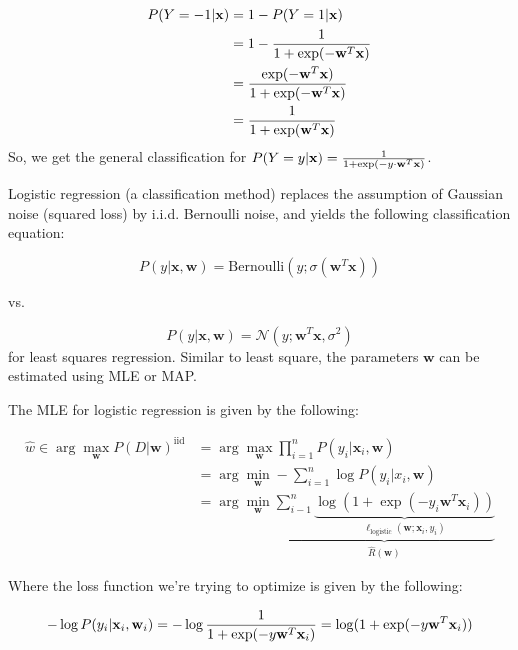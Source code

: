 \documentclass[a4paper,10pt,twoside]{article}
\begin{document}
\begin{align*}
  P(Y=-1|\mathbf{x}) &= 1 - P(Y=1|\mathbf{x})\\
                     &= 1 - {1\over 1+\exp(-\mathbf{w}^T\mathbf{x})}\\
                     &= {\exp(-\mathbf{w}^T\mathbf{x})\over 1+\exp(-\mathbf{w}^T\mathbf{x})}\\
                     &= {1\over 1+\exp(\mathbf{w}^T\mathbf{x})}
\end{align*}
So, we get the general classification for $P(Y=y|\mathbf{x}) = {1\over 1+\exp(-y\cdot\mathbf{w}^T\mathbf{x})}$.

Logistic regression (a classification method) replaces the assumption of Gaussian noise (squared loss) by i.i.d. Bernoulli noise, and yields the following classification equation:

\begin{equation*}
  P(y|\mathbf{x},\mathbf{w}) = \mathrm{Bernoulli}(y;\sigma(\mathbf{w}^T\mathbf{x}))
\end{equation*}

vs.

\begin{equation*}
  P(y|\mathbf{x},\mathbf{w}) = \mathcal{N}(y;\mathbf{w}^T\mathbf{x}, \sigma^2)
\end{equation*}
for least squares regression. Similar to least square, the parameters $\mathbf{w}$ can be estimated using MLE or MAP.

The MLE for logistic regression is given by the following:

\begin{align}\label{eq:mle_logistic_regression}
  \hat{w} \in\arg\max_{\mathbf{w}} P(D|\mathbf{w})^{\text{iid}} &= \arg\max_{\mathbf{w}}\prod_{i=1}^{n}P(y_i|\mathbf{x}_i, \mathbf{w})\\
  &= \arg\min_{\mathbf{w}} - \sum_{i=1}^{n}\log P(y_i|x_i,\mathbf{w})\\
  &= \arg\min_{\mathbf{w}}\underbrace{\sum_{i-1}^{n}\underbrace{\log(1+\exp(-y_i\mathbf{w}^T\mathbf{x}_i))}_{\ell_{\text{logistic}}(\mathbf{w};\mathbf{x}_i,y_i)}}_{\hat{R}(\mathbf{w})}
\end{align}

Where the loss function we're trying to optimize is given by the following:

\begin{equation*}
  -\log P(y_i|\mathbf{x}_i,\mathbf{w}_i) = -\log{1\over 1+\exp(-y\mathbf{w}^T\mathbf{x}_i)} = \log (1+\exp(-y\mathbf{w}^T\mathbf{x}_i))
\end{equation*}
\end{document}
